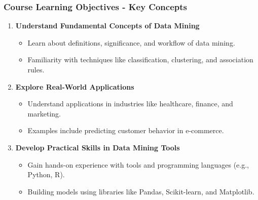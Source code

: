 \documentclass[aspectratio=169]{beamer}
\begin{document}
\begin{frame}[fragile]
    \frametitle{Course Learning Objectives - Key Concepts}
    \begin{enumerate}
        \item \textbf{Understand Fundamental Concepts of Data Mining}
        \begin{itemize}
            \item Learn about definitions, significance, and workflow of data mining.
            \item Familiarity with techniques like classification, clustering, and association rules.
        \end{itemize}
        
        \item \textbf{Explore Real-World Applications}
        \begin{itemize}
            \item Understand applications in industries like healthcare, finance, and marketing.
            \item Examples include predicting customer behavior in e-commerce.
        \end{itemize}
     
        \item \textbf{Develop Practical Skills in Data Mining Tools}
        \begin{itemize}
            \item Gain hands-on experience with tools and programming languages (e.g., Python, R).
            \item Building models using libraries like Pandas, Scikit-learn, and Matplotlib.
        \end{itemize}
    \end{enumerate}
\end{frame}
\end{document}
